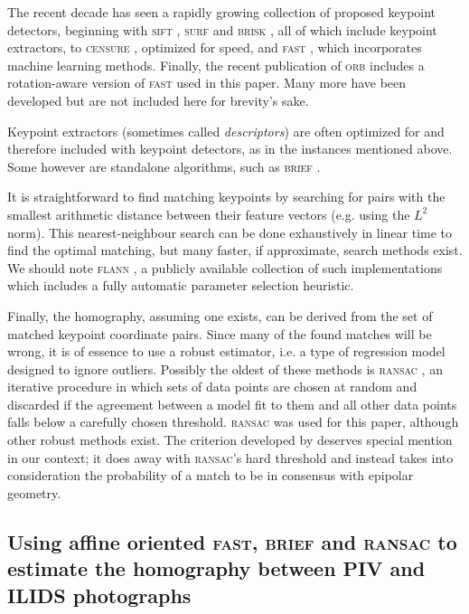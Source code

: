 \documentclass[11.5pt]{book}
\begin{document}
The recent decade has seen a rapidly growing collection of proposed keypoint detectors,
beginning with \textsc{sift} \cite{Lowe04}, \textsc{surf} \cite{Bay08} and
\textsc{brisk} \cite{Leutenegger11}, all of which include keypoint extractors, to
\textsc{censure} \cite{Agrawal08}, optimized for speed, and
\textsc{fast} \cite{Rosten05}, which incorporates machine learning methods.
Finally, the recent publication of \textsc{orb} \cite{Rublee11} includes a
rotation-aware version of \textsc{fast} used in this paper. Many more have been
developed but are not included here for brevity's sake.

Keypoint extractors (sometimes called \emph{descriptors}) are often optimized
for and therefore included with keypoint detectors, as in the instances
mentioned above. Some however are standalone algorithms, such as
\textsc{brief} \cite{Calonder10}.

It is straightforward to find matching keypoints by searching for pairs
with the smallest arithmetic distance between their feature vectors (e.g. using the $L^2$ norm). This nearest-neighbour search
can be done exhaustively in linear time to find the optimal matching, but many
faster, if approximate, search methods exist. We should note \textsc{flann} \cite{Muja09},
a publicly available collection of such implementations which includes a fully
automatic parameter selection heuristic.

Finally, the homography, assuming one exists, can be derived from the set of
matched keypoint coordinate pairs. Since many of the found matches will be
wrong, it is of essence to use a robust estimator, i.e. a type of regression
model designed to ignore outliers. Possibly the oldest of these methods is
\textsc{ransac} \cite{Fischler81}, an iterative procedure in which sets of data points are
chosen at random and discarded if the agreement between a model fit to them and
all other data points falls below a carefully chosen threshold. \textsc{ransac} was used
for this paper, although other robust methods exist. The criterion developed by
\citet{Moisan04} deserves special mention in our context; it does away with
\textsc{ransac}'s hard threshold and instead takes into consideration the probability of
a match to be in consensus with epipolar geometry.

\subsection{Using affine oriented \textsc{fast}, \textsc{brief} and \textsc{ransac} to estimate the homography
between PIV and ILIDS photographs \label{sec:results}}
\end{document}
